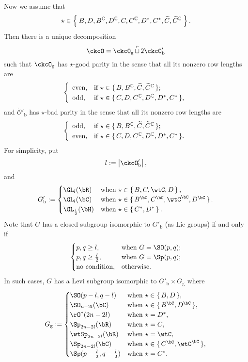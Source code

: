 \documentclass[12pt,a4paper]{amsart}
\def\abs#1{\left|{#1}\right|}
\newcommand{\CO}{{\mathcal {O}}}
\numberwithin{equation}{section}
\theoremstyle{remark}
\def\cuprow{{\stackrel{r}{\sqcup}}}
\def\cuprow{{\,\stackrel{r}{\sqcup}\,}}
\def\ckcOpb{\ckcO'_{\mathrm b}}
\def\ckcOg{\ckcO_{\mathrm g}}
\def\Gpb{G'_{\mathrm b}}
\def\Gg{G_{\mathrm g}}
\begin{document}
Now we assume that
\[
  \star\in \Set{ B, D, B^{\mathbb{C}}, D^{\mathbb{C}}, C, C^{\mathbb{C}}, D^*, C^*, \widetilde C, \widetilde C^{\mathbb{C}}}.
\]
Then there is a unique decomposition
\[
  \ckcO=\ckcOg \cuprow 2\ckcOpb
\]
such that $\ckcOg$ has $\star$-good parity in the sense that all its nonzero row
lengths are
\[
  \left\{
    \begin{array}{ll}
      \textrm{even}, &\hbox{if $\star\in \set{B, B^\C, \widetilde C, \widetilde C^\C}$}; \smallskip\\
      \textrm{odd}, &\hbox{if $\star\in \set{C, D, C^\C, D^\C, D^*, C^*}$},
    \end{array}
  \right.
\]
and $\check \CO'_{\mathrm b}$ has $\star$-bad parity in the sense that all its
nonzero row lengths are
\[
  \left\{
    \begin{array}{ll}
      \textrm{odd}, &\hbox{if  $\star\in \set{B, B^\C, \widetilde C, \widetilde C^\C}$}; \smallskip\\
      \textrm{even}, &\hbox{if  $\star\in \set{C, D, C^\C, D^\C, D^*, C^*}$}.
    \end{array}
  \right.
\]
For simplicity, put
\[
  l:=\abs{\ckcOpb},
\]
and
\[
  \Gpb := \begin{cases}
    \GL_{l}(\bR) & \text{when } \star \in \set{B,C,\wtC,D}, \\
    \GL_{l}(\bC) & \text{when } \star \in \set{B^{\bC},C^{\bC},\wtC^{\bC},D^{\bC}}. \\
    \GL_{\frac{l}{2}}(\bH) & \text{when } \star \in \set{C^{*},D^{*}}. \\
  \end{cases}
\]
Note that $G$ has a closed subgroup isomorphic to $\Gpb$ (as Lie groups) if and only if
\[
  \begin{cases}
    p,q\geq l, & \text{when $G = \SO(p,q)$};\\
    p,q\geq \frac{l}{2}, &  \text{when $G = \Sp(p,q)$};\\
    \text{no condition,} & \text{otherwise}.
  \end{cases}
\]
In such cases, $G$ has a Levi subgroup isomorphic to $\Gpb\times \Gg$ where
\[
  \Gg :=
  \begin{cases}
    \SO(p-l,q-l) & \textrm{when $\star\in \set{B,D}$},\\
    \SO_{n-2l}(\bC) &\textrm{when $\star\in \set{B^{\bC},D^{\bC}}$},\\
    \rO^{*}(2n-2l) &\textrm{when $\star = D^{*}$},\\
    \Sp_{2n-2l}(\bR) &\textrm{when $\star = C$},\\
    \wtSp_{2n-2l}(\bR) &\textrm{when $\star = \wtC$},\\
    \Sp_{2n-2l}(\bC) &\textrm{when $\star \in \set{C^{\bC},\wtC^{\bC}}$},\\
    \Sp(p-\frac{l}{2},q-\frac{l}{2}) &\textrm{when $\star = C^{*}$}.\\
  \end{cases}
\]
\end{document}
